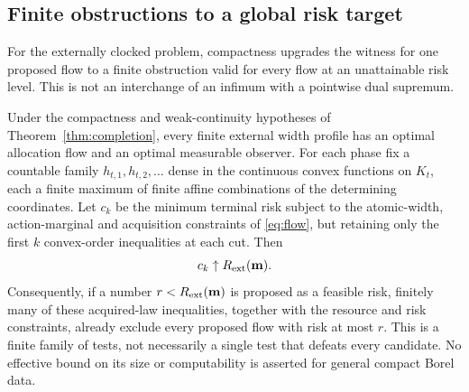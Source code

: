 \subsection{Finite obstructions to a global risk target}
For the externally clocked problem, compactness upgrades the witness for one proposed flow to a finite obstruction valid for every flow at an unattainable risk level. This is not an interchange of an infimum with a pointwise dual supremum.

\begin{theorem}\label{thm:finite_obstruction}
Under the compactness and weak-continuity hypotheses of Theorem~\ref{thm:completion}, every finite external width profile has an optimal allocation flow and an optimal measurable observer. For each phase fix a countable family $h_{t,1},h_{t,2},\ldots$ dense in the continuous convex functions on $K_t$, each a finite maximum of finite affine combinations of the determining coordinates. Let $c_k$ be the minimum terminal risk subject to the atomic-width, action-marginal and acquisition constraints of \eqref{eq:flow}, but retaining only the first $k$ convex-order inequalities at each cut. Then
\begin{equation}\label{eq:finite_obstruction}
 c_k\uparrow R_{\mathrm{ext}}(\mathbf m).
\end{equation}
Consequently, if a number $r<R_{\mathrm{ext}}(\mathbf m)$ is proposed as a feasible risk, finitely many of these acquired-law inequalities, together with the resource and risk constraints, already exclude every proposed flow with risk at most $r$. This is a finite family of tests, not necessarily a single test that defeats every candidate. No effective bound on its size or computability is asserted for general compact Borel data.
\end{theorem}
